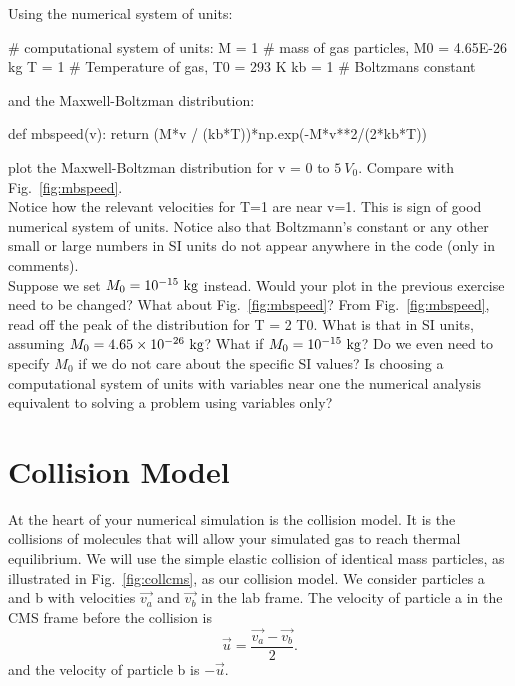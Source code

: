 {\plot Using the numerical system of units:
\begin{python}
# computational system of units:
M  = 1 # mass of gas particles, M0 = 4.65E-26 kg
T  = 1 # Temperature of gas, T0 = 293 K
kb = 1 # Boltzmans constant
\end{python}
and the Maxwell-Boltzman distribution:
\begin{python}
  def mbspeed(v):
      return (M*v / (kb*T))*np.exp(-M*v**2/(2*kb*T))
\end{python}
plot the Maxwell-Boltzman distribution for v = 0 to $5~V_0$.  Compare with Fig.~\ref{fig:mbspeed}.\\

Notice how the relevant velocities for T=1 are near v=1.  This is sign
of good numerical system of units.  Notice also that Boltzmann's
constant or any other small or large numbers in SI units do not appear
anywhere in the code (only in comments).\\

\plot Suppose we set $M_0=10^{-15}~\rm kg$ instead.  Would your plot
in the previous exercise need to be changed?  What about
Fig.~\ref{fig:mbspeed}?  From Fig.~\ref{fig:mbspeed}, read off the
peak of the distribution for T = 2 T0.  What is that in SI units,
assuming $M_0=4.65 \times 10^{-26}~\rm kg$?  What if $M_0=10^{-15}~\rm
kg$?  Do we even need to specify $M_0$ if we do not care about the
specific SI values?  Is choosing a computational system of units with
variables near one the numerical analysis equivalent to solving a
problem using variables only?

\section{Collision Model}

At the heart of your numerical simulation is the collision model.  It
is the collisions of molecules that will allow your simulated gas to
reach thermal equilibrium.  We will use the simple elastic collision
of identical mass particles, as illustrated in Fig.~\ref{fig:collcms}, as our collision model.  We consider particles a and b with velocities $\vec{v_a}$ and
$\vec{v_b}$ in the lab frame.  The velocity of particle a in the CMS frame before the collision is
\begin{displaymath}
\vec{u} = \frac{\vec{v_a} - \vec{v_b}}{2}.
\end{displaymath}
and the velocity of particle b is $-\vec{u}$.

}
